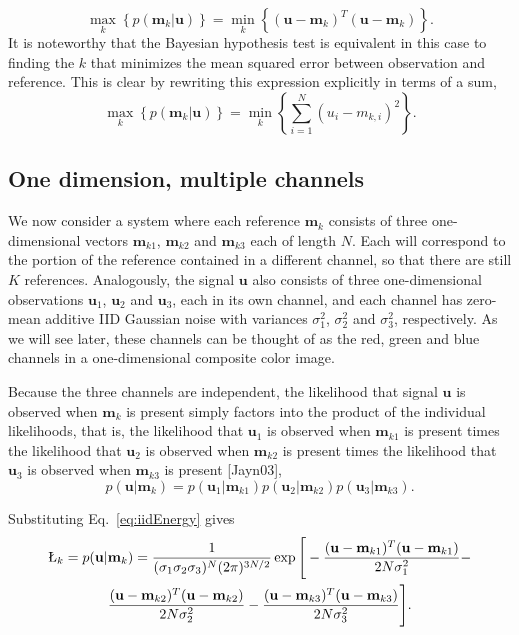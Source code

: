 \begin{equation}
\max_k   \left\{ p(\mathbf{m}_k|\mathbf{u}) \right\} = \min_k  \left\{ (\mathbf{u}-\mathbf{m}_k)^T(\mathbf{u}-\mathbf{m}_k) \right\}. 
\end{equation}
It is noteworthy that the Bayesian hypothesis test is equivalent in this case to finding the $k$ that minimizes the mean squared error between observation and reference. This is clear by rewriting this expression explicitly in terms of a sum,
\begin{equation}
\max_k   \left\{ p(\mathbf{m}_k|\mathbf{u}) \right\} =  \min_k  \left\{ \sum_{i=1}^N  (u_i-m_{k,i})^2   \right\}. 
\end{equation}

\subsection{One dimension, multiple channels}\label{sec:simpleModel}
We now consider a system where each reference $\mathbf{m}_k$ consists of three one-dimensional vectors $\mathbf{m}_{k1}$, $\mathbf{m}_{k2}$ and $\mathbf{m}_{k3}$ each of length $N$. Each will correspond to the portion of the reference contained in a different channel, so that there are still $K$ references. Analogously, the signal $\mathbf{u}$ also consists of three one-dimensional observations $\mathbf{u}_1$, $\mathbf{u}_2$ and $\mathbf{u}_3$, each in its own channel, and each channel has zero-mean additive IID Gaussian noise with variances $\sigma_1^2$, $\sigma_2^2$ and $\sigma_3^2$, respectively. As we will see later, these channels can be thought of as the red, green and blue channels in a one-dimensional composite color image. 

Because the three channels are independent, the likelihood that signal $\mathbf{u}$ is observed when $\mathbf{m}_k$ is present simply factors into the product of the individual likelihoods, that is, the likelihood that $\mathbf{u}_1$ is observed when $\mathbf{m}_{k1}$ is present times the likelihood that $\mathbf{u}_2$ is observed when $\mathbf{m}_{k2}$ is present times the likelihood that $\mathbf{u}_3$ is observed when $\mathbf{m}_{k3}$ is present [Jayn03],
\begin{equation}
p(\mathbf{u}|\mathbf{m}_k) = p(\mathbf{u}_1|\mathbf{m}_{k1})p(\mathbf{u}_2|\mathbf{m}_{k2})p(\mathbf{u}_3|\mathbf{m}_{k3}).
\end{equation}

Substituting Eq.~\ref{eq:iidEnergy} gives
\begin{multline}
\L_k=p(\mathbf{u}|\mathbf{m}_k) =\frac{1}{ (\sigma_1\sigma_2\sigma_3)^N  (2\pi)^{3N/2}  }  \exp\Bigg[ -\frac{(\mathbf{u}-\mathbf{m}_{k1})^T(\mathbf{u}-\mathbf{m}_{k1})} {2 N \sigma_1^2 }   - \\ \frac{(\mathbf{u}-\mathbf{m}_{k2})^T(\mathbf{u}-\mathbf{m}_{k2})} {2 N \sigma_2^2 } -\frac{(\mathbf{u}-\mathbf{m}_{k3})^T(\mathbf{u}-\mathbf{m}_{k3})} {2 N \sigma_3^2 }    \Bigg].
\end{multline}

